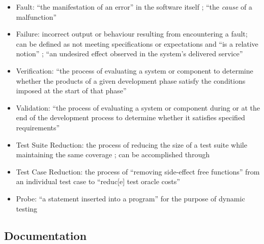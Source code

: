 \begin{itemize}
            \citep[p.~399]{vanVliet2000}
      \item Fault: ``the manifestation of an error'' in the software itself
            \citep[p.~400]{vanVliet2000}; ``the \emph{cause} of a malfunction''
            \citep[p.~5-3]{SWEBOK2024}
      \item Failure: incorrect output or behaviour resulting from encountering
            a fault; can be defined as not meeting specifications or
            expectations and ``is a relative notion''
            \citep[p.~400]{vanVliet2000}; ``an undesired effect observed in the
            system's delivered service'' \citep[p.~5-3]{SWEBOK2024}
      \item Verification: ``the process of evaluating a system or component
            to determine whether the products of a given development phase
            satisfy the conditions imposed at the start of that phase''
            \citep[p.~400]{vanVliet2000}
      \item Validation: ``the process of evaluating a system or component
            during or at the end of the development process to determine
            whether it satisfies specified requirements''
            \citep[p.~400]{vanVliet2000}
      \item Test Suite Reduction: the process of reducing the size of a test
            suite while maintaining the same coverage
            \citep[p.~519]{BarrEtAl2015}; can be accomplished through
      \item Test Case Reduction: the process of ``removing side-effect free
            functions'' from an individual test case to ``reduc[e] test oracle
            costs'' \citep[p.~519]{BarrEtAl2015}
      \item Probe: ``a statement inserted into a program'' for the purpose of
            dynamic testing \citep[p.~438]{PetersAndPedrycz2000}
\end{itemize}

\subsection{Documentation}

